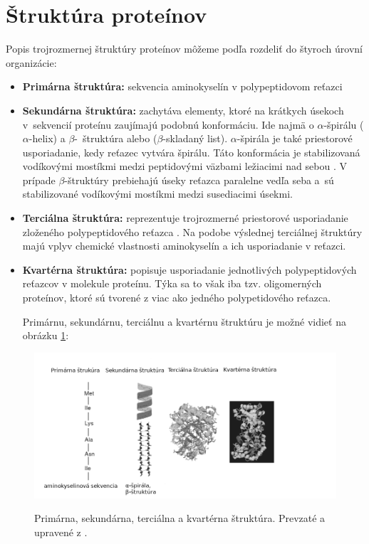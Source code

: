 \section{Štruktúra proteínov}
Popis trojrozmernej štruktúry proteínov môžeme podľa \cite{aminokyseliny} rozdeliť do štyroch úrovní organizácie:

\begin{itemize}
	\item \textbf{Primárna štruktúra:} sekvencia aminokyselín v polypeptidovom reťazci
	\item \textbf{Sekundárna štruktúra:} zachytáva elementy, ktoré na krátkych úsekoch v~sekvencií proteínu zaujímajú podobnú konformáciu. Ide najmä o $\alpha$\--špirálu ($\alpha$\--helix) a $\beta$\--~štruktúra alebo ($\beta$\--skladaný list). $\alpha$\--špirála je také priestorové usporiadanie, kedy reťazec vytvára špirálu. Táto konformácia je stabilizovaná vodíkovými mostíkmi medzi peptidovými väzbami ležiacimi nad sebou \cite{bibid}. V prípade $\beta$\--štruktúry prebiehajú úseky reťazca paralelne vedľa seba a~sú stabilizované vodíkovými mostíkmi medzi susediacimi úsekmi.
	\item \textbf{Terciálna štruktúra:} reprezentuje trojrozmerné priestorové usporiadanie zloženého polypeptidového reťazca \cite{aminokyseliny}. Na podobe výslednej terciálnej štruktúry majú vplyv chemické vlastnosti aminokyselín a ich usporiadanie v reťazci. 
	\item \textbf{Kvartérna štruktúra:} popisuje usporiadanie jednotlivých polypeptidových reťazcov v molekule proteínu. Týka sa to však iba tzv. oligomerných proteínov, ktoré sú tvorené z viac ako jedného polypetidového reťazca.
	
	Primárnu, sekundárnu, terciálnu a kvartérnu štruktúru je možné vidieť na obrázku \ref{struktura}:
\end{itemize}
\begin{figure}[H]
		\begin{center}
		\scalebox{0.5}
		{   
			\includegraphics{structure.png}
		}
		\caption{Primárna, sekundárna, terciálna a kvartérna štruktúra. Prevzaté a upravené z \cite{gromiha}.}
		\label{struktura}
	\end{center}
\end{figure}

